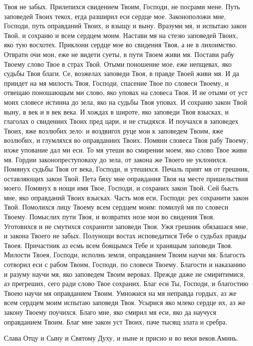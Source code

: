 Твоя не забых. Прилепихся свидением Твоим, Господи, не посрами
мене. Путь заповедей Твоих текох, егда разширил еси сердце мое.
Законоположи мне, Господи, путь оправданий Твоих, и взыщу и выну.
Вразуми мя, и испытаю закон Твой, и сохраню и всем сердцем моим.
Настави мя на стезю заповедей Твоих, яко тую восхотех. Приклони
сердце мое во свидения Твоя, а не в лихоимство. Отврати очи мои,
еже не видети суеты, в пути Твоем живи мя. Постави рабу Твоему
слово Твое в страх Твой. Отыми поношение мое, еже непщевах, яко
судьбы Твоя благи. Се, возжелах заповеди Твоя, в правде Твоей живи
мя. И да приидет на мя милость Твоя, Господи, спасение Твое по
словеси Твоему, и отвещаю поношающым ми слово, яко уповах на
словеса Твоя. И не отыми от уст моих словесе истинна до зела, яко
на судьбы Твоя уповах. И сохраню закон Твой выну, в век и в век
века. И хождах в широте, яко заповеди Твоя взысках, и глаголах о
свидениих Твоих пред цари, и не стыдяхся. И поучахся в заповедех Твоих,
яже возлюбих зело: и воздвигох руце мои к заповедем Твоим, яже
возлюбих, и глумляхся во оправданиих Твоих. Помяни словеса Твоя рабу
Твоему, ихже упование дал ми еси. То мя утеши во смирении моем, яко
слово Твое живи мя. Гордии законопреступоваху до зела, от закона
же Твоего не уклонихся. Помянух судьбы Твоя от века, Господи, и
утешихся. Печаль прият мя от грешник, оставляющих закон Твой. Пета
бяху мне оправдания Твоя на месте пришельствия моего. Помянух в
нощи имя Твое, Господи, и сохраних закон Твой. Сей бысть мне, яко
оправданий Твоих взысках. Часть моя еси, Господи: рех сохранити
закон Твой. Помолихся лицу Твоему всем сердцем моим: помилуй мя
по словеси Твоему. Помыслих пути Твоя, и возвратих нозе мои во
свидения Твоя. Уготовихся и не смутихся сохранити заповеди Твоя.
Ужя грешник обязашася мне, и закона Твоего не забых. Полунощи
востах исповедатися Тебе о судьбах правды Твоея. Причастник аз есмь
всем боящымся Тебе и хранящым заповеди Твоя. Милости Твоея,
Господи, исполнь земля, оправданием Твоим научи мя. Благость
сотворил еси с рабом Твоим, Господи, по словеси Твоему. Благости и
наказанию и разуму научи мя, яко заповедем Твоим веровах. Прежде
даже не смиритимися, аз прегреших, сего ради слово Твое сохраних.
Благ еси Ты, Господи, и благостию Твоею научи мя оправданием
Твоим. Умножися на мя неправда гордых, аз же всем сердцем моим
испытаю заповеди Твоя. Усырися яко млеко сердце их, аз же закону
Твоему поучихся. Благо мне, яко смирил мя еси, яко да научуся
оправданием Твоим. Благ мне закон уст Твоих, паче тысящ злата и
сребра.

Слава Отцу и Сыну и Святому Духу, и ныне и присно и во веки веков.Аминь.

